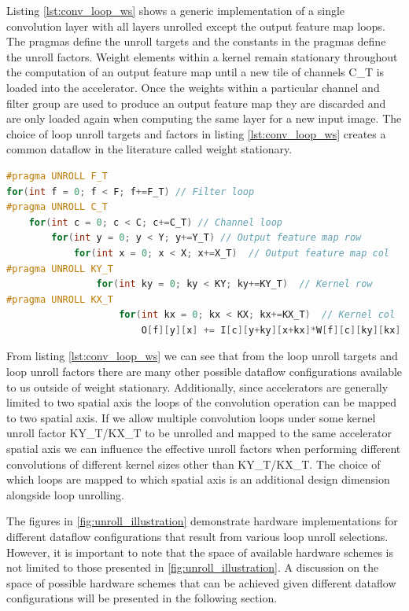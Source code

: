 Listing \ref{lst:conv_loop_ws} shows a generic
implementation of a single convolution layer with all layers unrolled except the
output feature map loops. The pragmas define the unroll
targets and the constants in the pragmas define the unroll factors. 
Weight elements within a
kernel remain stationary throughout the computation of an output feature map
until a new tile of channels C\_T is loaded into the accelerator. Once the
weights within a particular channel and filter group are used to produce an
output feature map they are discarded and are only loaded again when computing
the same layer for a new input image. The choice of loop unroll targets and factors
in listing \ref{lst:conv_loop_ws} creates a common dataflow in
the literature called weight stationary.

\begin{minipage}{\linewidth}
    \begin{lstlisting}[language=C, caption=Convolution implemented as nested loops, label={lst:conv_loop_ws}]
#pragma UNROLL F_T
for(int f = 0; f < F; f+=F_T) // Filter loop
#pragma UNROLL C_T
    for(int c = 0; c < C; c+=C_T) // Channel loop
        for(int y = 0; y < Y; y+=Y_T) // Output feature map row
            for(int x = 0; x < X; x+=X_T)  // Output feature map col
#pragma UNROLL KY_T
                for(int ky = 0; ky < KY; ky+=KY_T)  // Kernel row
#pragma UNROLL KX_T
                    for(int kx = 0; kx < KX; kx+=KX_T)  // Kernel col
                        O[f][y][x] += I[c][y+ky][x+kx]*W[f][c][ky][kx];
    \end{lstlisting}
\end{minipage}
 

From listing \ref{lst:conv_loop_ws} we
can see that from the loop unroll targets and loop unroll factors there are many
other possible dataflow configurations available to us outside of weight
stationary. Additionally, since accelerators are generally limited to two
spatial axis the loops of the convolution operation can be mapped to two spatial
axis. If we allow multiple convolution loops under some kernel unroll factor
KY\_T/KX\_T  to be unrolled and mapped to the same accelerator spatial axis we
can influence the effective unroll factors when performing different
convolutions of different kernel sizes other than KY\_T/KX\_T. The choice of
which loops are mapped to which spatial axis is an additional design dimension
alongside loop unrolling. 

The figures in \autoref{fig:unroll_illustration} demonstrate hardware
implementations for different dataflow configurations that result from various
loop unroll selections. However, it is important to note that the space of
available hardware schemes is not limited to those presented in
\autoref{fig:unroll_illustration}. A discussion on the space of possible
hardware schemes that can be achieved given different dataflow configurations
will be presented in the following section.

